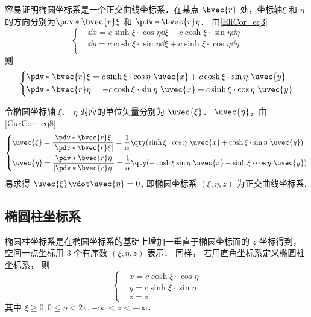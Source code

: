 容易证明椭圆坐标系是一个正交曲线坐标系．在某点 $\bvec{r}$ 处，坐标轴$\xi$ 和 $\eta$ 的方向分别为$\pdv*{\bvec{r}}{\xi}$ 和 $\pdv*{\bvec{r}}{\eta}$．
由\autoref{EliCor_eq3} 
\begin{equation}
\left\{
    \begin{aligned}
    &\dd x=c\sinh\xi\cdot\cos\eta\dd\xi-c\cosh\xi\cdot\sin\eta\dd\eta\\
    &\dd y=c\cosh\xi\cdot\sin\eta\dd\xi+c\sinh\xi\cdot\cos\eta\dd\eta\\
    \end{aligned}\right.
\end{equation}
则
\begin{equation}
\left\{
    \begin{aligned}
&\pdv*{\bvec{r}}{\xi}=c\sinh\xi\cdot\cos\eta\ \uvec{x}+c\cosh\xi\cdot\sin\eta\ \uvec{y}\\
&\pdv*{\bvec{r}}{\eta}=-c\cosh\xi\cdot\sin\eta\ \uvec{x}+c\sinh\xi\cdot\cos\eta\ \uvec{y}\\
    \end{aligned}\right.
\end{equation}

令椭圆坐标轴 $\xi$、 $\eta$ 对应的单位矢量分别为 $\uvec{\xi}$、 $\uvec{\eta}$，由\autoref{CurCor_eq8}~
\begin{equation}
\left\{
    \begin{aligned}
    &\uvec{\xi}=\frac{\pdv*{\bvec{r}}{\xi}}{|\pdv*{\bvec{r}}{\xi}|}=\frac{1}{\alpha}\qty(\sinh\xi\cdot\cos\eta\ \uvec{x}+\cosh\xi\cdot\sin\eta\ \uvec{y})\\
    &\uvec{\eta }=\frac{\pdv*{\bvec{r}}{\eta}}{|\pdv*{\bvec{r}}{\eta}|}=\frac{1}{\alpha}\qty(-\cosh\xi\sin\eta\ \uvec{x}+\sinh\xi\cdot\cos\eta\ \uvec{y})\\
    \end{aligned}\right.
\end{equation}
易求得 $\uvec{\xi}\vdot\uvec{\eta} = 0$,  即椭圆坐标系 $(\xi,\eta,z)$ 为正交曲线坐标系.

\subsection{椭圆柱坐标系}
椭圆柱坐标系是在椭圆坐标系的基础上增加一垂直于椭圆坐标面的 $z$ 坐标得到， 空间一点坐标用 3 个有序数 $(\xi,\eta,z)$ 表示． 同样， 若用直角坐标系定义椭圆柱坐标系， 则
\begin{equation}\label{EliCor_eq1}
\left\{\begin{aligned}
&x=c\cosh\xi\cdot\cos\eta\\
&y=c\sinh\xi\cdot\sin\eta\\
&z=z
\end{aligned}\right.
\end{equation}
其中 $\xi\geq0,0\leq\eta<2\pi,-\infty<z<+\infty$．

